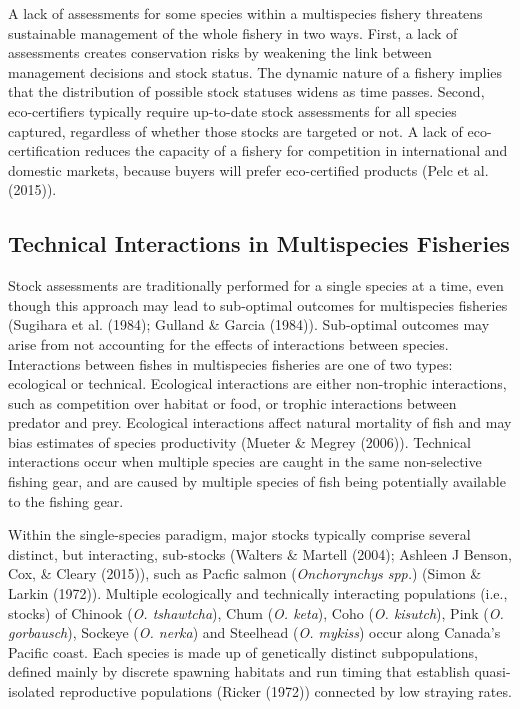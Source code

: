\documentclass[12pt,]{scrartcl}
\begin{document}
A lack of assessments for some species within a multispecies fishery
threatens sustainable management of the whole fishery in two ways.
First, a lack of assessments creates conservation risks by weakening the
link between management decisions and stock status. The dynamic nature
of a fishery implies that the distribution of possible stock statuses
widens as time passes. Second, eco-certifiers typically require
up-to-date stock assessments for all species captured, regardless of
whether those stocks are targeted or not. A lack of eco-certification
reduces the capacity of a fishery for competition in international and
domestic markets, because buyers will prefer eco-certified products
(Pelc et al. (2015)).

\subsection{Technical Interactions in Multispecies
Fisheries}\label{technical-interactions-in-multispecies-fisheries}

Stock assessments are traditionally performed for a single species at a
time, even though this approach may lead to sub-optimal outcomes for
multispecies fisheries (Sugihara et al. (1984); Gulland \& Garcia
(1984)). Sub-optimal outcomes may arise from not accounting for the
effects of interactions between species. Interactions between fishes in
multispecies fisheries are one of two types: ecological or technical.
Ecological interactions are either non-trophic interactions, such as
competition over habitat or food, or trophic interactions between
predator and prey. Ecological interactions affect natural mortality of
fish and may bias estimates of species productivity (Mueter \& Megrey
(2006)). Technical interactions occur when multiple species are caught
in the same non-selective fishing gear, and are caused by multiple
species of fish being potentially available to the fishing gear.

Within the single-species paradigm, major stocks typically comprise
several distinct, but interacting, sub-stocks (Walters \& Martell
(2004); Ashleen J Benson, Cox, \& Cleary (2015)), such as Pacfic salmon
(\emph{Onchorynchys spp.}) (Simon \& Larkin (1972)). Multiple
ecologically and technically interacting populations (i.e., stocks) of
Chinook (\emph{O. tshawtcha}), Chum (\emph{O. keta}), Coho (\emph{O.
kisutch}), Pink (\emph{O. gorbausch}), Sockeye (\emph{O. nerka}) and
Steelhead (\emph{O. mykiss}) occur along Canada's Pacific coast. Each
species is made up of genetically distinct subpopulations, defined
mainly by discrete spawning habitats and run timing that establish
quasi-isolated reproductive populations (Ricker (1972)) connected by low
straying rates.
\end{document}
